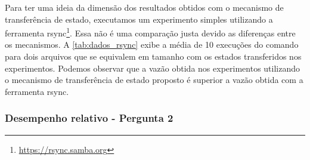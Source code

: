 \begin{table}[htb]
\end{table}

Para ter uma ideia da dimensão dos resultados obtidos com o mecanismo de transferência de
estado, executamos um experimento simples utilizando a ferramenta
rsync\footnote{\url{https://rsync.samba.org}}. Essa não é uma comparação justa devido as
diferenças entre os mecanismos. A \autoref{tab:dados_rsync} exibe a média de 10 execuções
do comando  para dois arquivos que se equivalem em tamanho com os
estados transferidos nos experimentos. Podemos observar que a vazão obtida nos
experimentos utilizando o mecanismo de transferência de estado proposto é superior a vazão
obtida com a ferramenta rsync.

\begin{table}[htb]
\end{table}

\subsubsection{Desempenho relativo - Pergunta 2}

